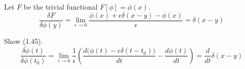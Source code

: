 


\bigskip
Let $F$ be the trivial functional $F[\phi]=\phi(x)$.
\begin{equation*}
\frac{\delta F}{\delta\phi(y)}
=\lim_{\epsilon\rightarrow0}
\frac{\phi(x)+\epsilon\delta(x-y)-\phi(x)}{\epsilon}
=\delta(x-y)
\end{equation*}

Show (1.45).
\begin{equation*}
\frac{\delta\dot\phi(t)}{\delta\phi(t_0)}
=\lim_{\epsilon\rightarrow0}\frac{1}{\epsilon}
\left(
\frac{d\big(\phi(t)-\epsilon\delta(t-t_0)\big)}{dt}-\frac{d\phi(t)}{dt}
\right)
=\frac{d}{dt}\delta(x-y)
\end{equation*}


